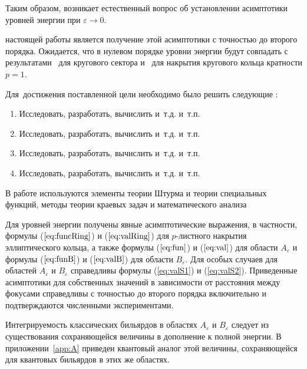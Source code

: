 Таким образом, возникает естественный вопрос об установлении асимптотики уровней энергии при $\varepsilon\to 0$. 

{\aim} настоящей работы является получение этой асимптотики с точностью до второго порядка. Ожидается, что в нулевом порядке уровни энергии будут совпадать с результатами~\cite{wref13} для кругового сектора и~\cite[\S~207, с.~276]{wref11} для накрытия кругового кольца кратности $p=1$.

Для~достижения поставленной цели необходимо было решить следующие {\tasks}:
\begin{enumerate}[beginpenalty=10000] %
  \item Исследовать, разработать, вычислить и~т.\:д. и~т.\:п.
  \item Исследовать, разработать, вычислить и~т.\:д. и~т.\:п.
  \item Исследовать, разработать, вычислить и~т.\:д. и~т.\:п.
  \item Исследовать, разработать, вычислить и~т.\:д. и~т.\:п.
\end{enumerate}


{\methods} В работе используются элементы теории Штурма и теории специальных функций, методы теории краевых задач и математического анализа

{\novelty} Для уровней энергии получены явные асимптотические выражения, в частности, формулы ($\ref{eq:funcRing}$) и ($\ref{eq:valRing}$) для $p$-листного накрытия эллиптического кольца, а также формулы ($\ref{eq:fun}$) и ($\ref{eq:val}$) для области $A_\varepsilon$ и формулы  ($\ref{eq:funB}$) и ($\ref{eq:valB}$) для области  $B_\varepsilon$. Для особых случаев для областей $A_\varepsilon$ и $B_\varepsilon$ справедливы формулы (\ref{eq:valS1}) и (\ref{eq:valS2}). 
Приведенные асимптотики для собственных значений в зависимости от расстояния между фокусами справедливы с точностью до второго порядка включительно и подтверждаются численными экспериментами.

Интегрируемость классических бильярдов в областях $A_\varepsilon$ и $B_\varepsilon$ следует из существования сохраняющейся величины в дополнение к полной энергии.
В приложении~\ref{app:A} приведен квантовый аналог этой величины, сохраняющейся для квантовых бильярдов в этих же областях.


